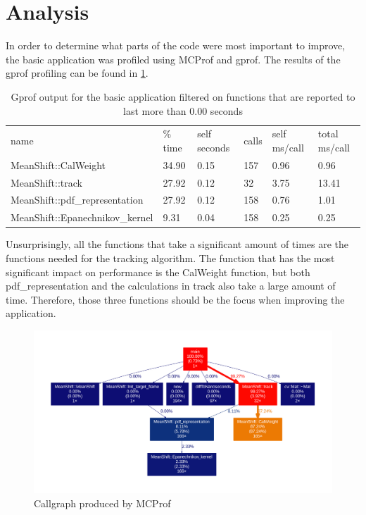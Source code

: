 \documentclass[final]{article}
\begin{document}
\section{Analysis}
In order to determine what parts of the code were most important to improve, the basic application was profiled using MCProf and gprof. The results of the gprof profiling can be found in \cref{tab:gprof}.

\begin{table}[H]
\centering
\begin{tabular}{llllll}
name & \% time& self seconds & calls &  self ms/call & total ms/call \\
MeanShift::CalWeight & 34.90   &   0.15  &    157&     0.96 &    0.96  \\
MeanShift::track & 27.92    &   0.12   &    32 &    3.75  &  13.41 \\
MeanShift::pdf\_representation & 27.92     &  0.12    &  158  &   0.76   &  1.01  \\
MeanShift::Epanechnikov\_kernel & 9.31      &   0.04     & 158   &  0.25    & 0.25  \\
\end{tabular}
\caption{Gprof output for the basic application filtered on functions that are reported to last more than 0.00 seconds}
\label{tab:gprof}
\end{table}

Unsurprisingly, all the functions that take a significant amount of times are the functions needed for the tracking algorithm. The function that has the most significant impact on performance is the CalWeight function, but both pdf\_representation and the calculations in track also take a large amount of time. Therefore, those three functions should be the focus when improving the application.

\begin{figure}[H]
\includegraphics[width=\textwidth]{resources/callgraphAll.pdf}
\caption{Callgraph produced by MCProf}
\label{fig:callgraph}
\end{figure}
\end{document}
